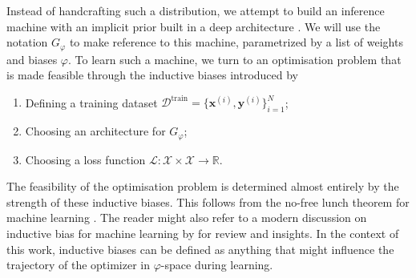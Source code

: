 \documentclass[twocolumn]{aastex631}
\newcommand{\subscript}[2]{$#1 _ #2$}
\begin{document}
Instead of handcrafting such a distribution, we 
attempt to build an inference machine with
an implicit prior built in a deep architecture \citep{Bengio2009}. We 
will use the notation $G_{\varphi}$ to make reference to this machine, 
parametrized by a list of weights and biases $\varphi$. 
To learn such a machine, we turn to an optimisation problem 
that is made feasible through the inductive biases
introduced by
\begin{enumerate}[label=(\subscript{\mathcal{H}}{{\arabic*}})]
        \item \label{prior:dataset} Defining a training dataset
                ${\mathcal{D}^{\mathrm{train}} = \{\mathbf{\mathbf{x}}^{(i)}, \mathbf{y}^{(i)} \}_{i=1}^{N}}$;
        \item \label{prior:architecture} Choosing an architecture for $G_{\varphi}$;
        \item \label{prior:loss function} Choosing a loss function 
                $\mathcal{L}: \mathcal{X}\times \mathcal{X} \rightarrow \mathbb{R}$.
\end{enumerate}
The feasibility of the optimisation problem is determined almost entirely 
by the strength of these inductive biases. This follows from 
the no-free lunch theorem for machine learning 
\citep{Wolpert1995,Baxter2000}. The reader 
might also refer to a modern discussion on inductive bias for machine learning 
by \citep{Goyal2020} for review and insights. In the context of this work, 
inductive biases can be defined as anything that might influence the 
trajectory of the optimizer in $\varphi$-space during learning. 

\end{document}
